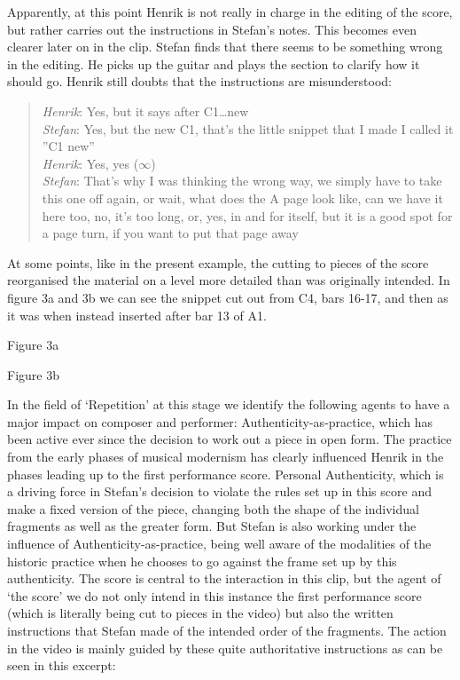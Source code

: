 Apparently, at this point Henrik is not really in charge in the
editing of the score, but rather carries out the instructions in
Stefan's notes. This becomes even clearer later on in the clip. Stefan
finds that there seems to be something wrong in the editing. He picks
up the guitar and plays the section to clarify how it should
go. Henrik still doubts that the instructions are misunderstood:

\begin{quote}
  \emph{Henrik}: Yes, but  it says after C1\ldots new\\
  \emph{Stefan}: Yes, but the new C1, that's the little snippet that I made I
  called it ''C1 new''\\
  \emph{Henrik}: Yes, yes ($\infty$)\\
  \emph{Stefan}: That's why I was thinking the wrong way, we simply have to
  take this one off again, or wait, what does the A page look like,
  can we have it here too, no, it's too long, or, yes, in and for
  itself, but it is a good spot for a page turn, if you want to put
  that page away\\
\end{quote}

At some points, like in the present example, the cutting to pieces of
the score reorganised the material on a level more detailed than was
originally intended. In figure 3a and 3b we can see the snippet cut
out from C4, bars 16-17, and then as it was when instead inserted
after bar 13 of A1.
 

Figure 3a
 
Figure 3b


In the field of `Repetition' at this stage we identify the following
agents to have a major impact on composer and performer:
Authenticity-as-practice, which has been active ever since the
decision to work out a piece in open form. The practice from the early
phases of musical modernism has clearly influenced Henrik in the
phases leading up to the first performance score. Personal
Authenticity, which is a driving force in Stefan's decision to violate
the rules set up in this score and make a fixed version of the piece,
changing both the shape of the individual fragments as well as the
greater form. But Stefan is also working under the influence of
Authenticity-as-practice, being well aware of the modalities of the
historic practice when he chooses to go against the frame set up by
this authenticity. The score is central to the interaction in this
clip, but the agent of `the score' we do not only intend in this
instance the first performance score (which is literally being cut to
pieces in the video) but also the written instructions that Stefan
made of the intended order of the fragments. The action in the video
is mainly guided by these quite authoritative instructions as can be
seen in this excerpt:
 
